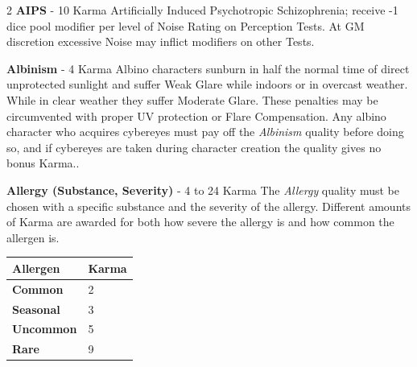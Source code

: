 \documentclass[
  oneside]{article}
\begin{document}
\begin{multicols}{2}
\textbf{AIPS} - 10 Karma Artificially Induced
Psychotropic Schizophrenia; receive -1 dice pool
modifier per level of Noise Rating on Perception
Tests. At GM discretion excessive Noise may
inflict modifiers on other Tests.

\textbf{Albinism} - 4 Karma Albino characters
sunburn in half the normal time of direct
unprotected sunlight and suffer Weak Glare while
indoors or in overcast weather. While in clear
weather they suffer Moderate Glare. These
penalties may be circumvented with proper UV
protection or Flare Compensation. Any albino
character who acquires cybereyes must pay off the
\emph{Albinism} quality before doing so, and if
cybereyes are taken during character creation the
quality gives no bonus Karma..

\textbf{Allergy (Substance, Severity)} - 4 to 24
Karma The \emph{Allergy} quality must be chosen
with a specific substance and the severity of the
allergy. Different amounts of Karma are awarded
for both how severe the allergy is and how common
the allergen is.

\end{multicols}

\begin{longtable}[]{@{}ll@{}}
\toprule\noalign{}
Allergen & Karma \\
\midrule\noalign{}
\endhead
\bottomrule\noalign{}
\endlastfoot
\textbf{Common} & 2 \\
\textbf{Seasonal} & 3 \\
\textbf{Uncommon} & 5 \\
\textbf{Rare} & 9 \\
\end{longtable}
\end{document}
